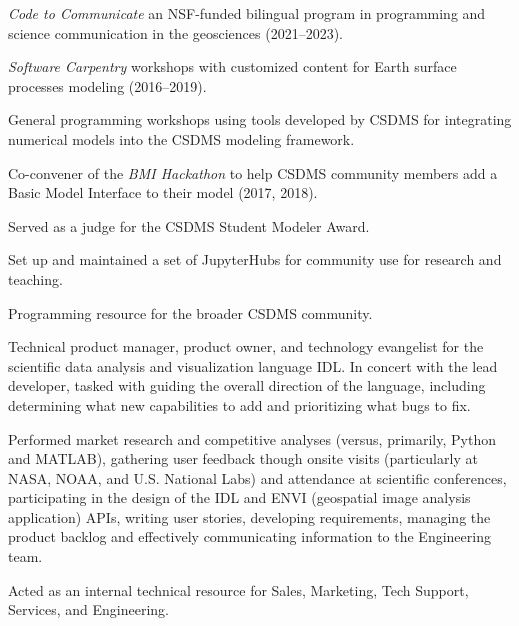 \begin{compactitem}[\itembullet]
\begin{compactitem}[\itembullet]
        \textit{Code to Communicate} an NSF-funded bilingual program in
        programming and science communication in the geosciences (2021--2023).
      \item
        \textit{Software Carpentry} workshops with customized content for Earth
        surface processes modeling (2016--2019).
      \item
        General programming workshops using tools developed by CSDMS for
        integrating numerical models into the CSDMS modeling framework.
    \end{compactitem}
    \item
    Co-convener of the \textit{BMI Hackathon} to help CSDMS
    community members add a Basic Model Interface to their model (2017, 2018).
  \item
    Served as a judge for the CSDMS Student Modeler Award.
  \item
    Set up and maintained a set of JupyterHubs for community use for research
    and teaching.
  \item
    Programming resource for the broader CSDMS community.
\end{compactitem}

\begin{compactitem}[\itembullet]
  \item Technical product manager, product owner, and technology
    evangelist for the scientific data analysis and visualization
    language IDL. In concert with the lead developer, tasked with
    guiding the overall direction of the language, including
    determining what new capabilities to add and prioritizing what
    bugs to fix.
  \item Performed market research and competitive analyses (versus,
    primarily, Python and MATLAB), gathering user feedback though
    onsite visits (particularly at NASA, NOAA, and U.S. National Labs)
    and attendance at scientific conferences, participating in the
    design of the IDL and ENVI (geospatial image analysis application)
    APIs, writing user stories, developing requirements, managing the
    product backlog and effectively communicating information to the
    Engineering team.
  \item Acted as an internal technical resource for Sales, Marketing,
    Tech Support, Services, and Engineering.
\end{compactitem}

